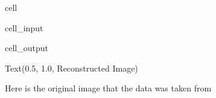 \documentclass[letterpaper,10pt,english]{jupyterBook}
\begin{document}
\begin{sphinxuseclass}{cell}\begin{sphinxVerbatimInput}

\begin{sphinxuseclass}{cell_input}
\begin{sphinxVerbatim}[commandchars=\\\{\}]
   
  
\end{sphinxVerbatim}

\end{sphinxuseclass}\end{sphinxVerbatimInput}
\begin{sphinxVerbatimOutput}

\begin{sphinxuseclass}{cell_output}
\begin{sphinxVerbatim}[commandchars=\\\{\}]
Text(0.5, 1.0, \PYGZsq{}Reconstructed Image\PYGZsq{})
\end{sphinxVerbatim}

\noindent{}

\end{sphinxuseclass}\end{sphinxVerbatimOutput}

\end{sphinxuseclass}
\sphinxAtStartPar
Here is the original image that the data was taken from
\end{document}

